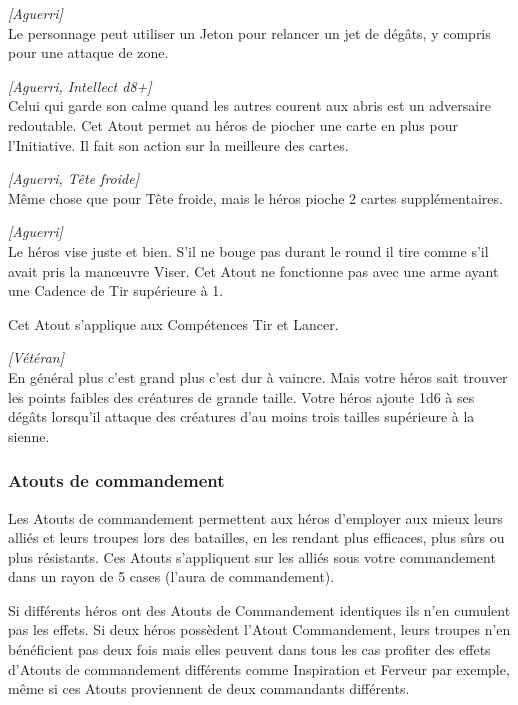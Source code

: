\begin{description}[align=left]
    \item [Sans pitié]
    	\emph{[Aguerri]}\\
        Le personnage peut utiliser un Jeton pour relancer un jet de dégâts, y compris pour une attaque de zone.

    \item [Tête froide]
    	\emph{[Aguerri, Intellect d8+]}\\
        Celui qui garde son calme quand les autres courent aux abris est un adversaire redoutable. Cet Atout permet au héros de piocher une carte en plus pour l’Initiative. Il fait son action sur la meilleure des cartes.

    \item [Sang-froid]
    	\emph{[Aguerri, Tête froide]}\\
        Même chose que pour Tête froide, mais le héros pioche 2 cartes supplémentaires.

    \item [Tireur d’élite]
    	\emph{[Aguerri]}\\
        Le héros vise juste et bien. S’il ne bouge pas durant le round il tire comme s’il avait pris la man\oe{uvre} Viser. Cet Atout ne fonctionne pas avec une arme ayant une Cadence de Tir supérieure à 1.
		
		Cet Atout s’applique aux Compétences Tir et Lancer.

    \item [Tueur de géant]
    	\emph{[Vétéran]}\\
        En général plus c’est grand plus c’est dur à vaincre. Mais votre héros sait trouver les points faibles des créatures de grande taille. Votre héros ajoute 1d6 à ses dégâts lorsqu’il attaque des créatures d’au moins trois tailles supérieure à la sienne.

\end{description}

\subsubsection{Atouts de commandement}
Les Atouts de commandement permettent aux héros d’employer aux mieux leurs alliés et leurs troupes lors des batailles, en les rendant plus efficaces, plus sûrs ou plus résistants. Ces Atouts s’appliquent sur les alliés sous votre commandement dans un rayon de 5 cases (l’aura de commandement). 

Si différents héros ont des Atouts de Commandement identiques ils n’en cumulent pas les effets. Si deux héros possèdent l’Atout Commandement, leurs troupes n’en bénéficient pas deux fois mais elles peuvent dans tous les cas profiter des effets d’Atouts de commandement différents comme Inspiration et Ferveur par exemple, même si ces Atouts proviennent de deux commandants différents.

